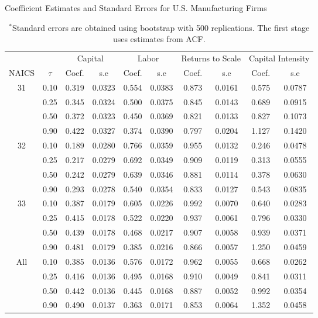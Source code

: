 \documentclass[12pt]{article}
\begin{document}
\begin{table}[H]
\centering
\caption{Coefficient Estimates and Standard Errors for U.S. Manufacturing Firms}
\small
\begin{tabular}{cccccccccc}
  \hline\hline & & \multicolumn{2}{c}{Capital}  & \multicolumn{2}{c}{Labor} & \multicolumn{2}{c}{Returns to Scale} & \multicolumn{2}{c}{Capital Intensity}\\ \cmidrule(lr){3-4} \cmidrule(lr){5-6} \cmidrule(lr){7-8} \cmidrule(lr){9-10}NAICS & $\tau$ & Coef. & s.e & Coef. & s.e & Coef. & s.e & Coef. & s.e \\ 
  \hline
31 & 0.10 & 0.319 & 0.0323 & 0.554 & 0.0383 & 0.873 & 0.0161 & 0.575 & 0.0787 \\ 
   & 0.25 & 0.345 & 0.0324 & 0.500 & 0.0375 & 0.845 & 0.0143 & 0.689 & 0.0915 \\ 
   & 0.50 & 0.372 & 0.0323 & 0.450 & 0.0369 & 0.821 & 0.0133 & 0.827 & 0.1073 \\ 
   & 0.90 & 0.422 & 0.0327 & 0.374 & 0.0390 & 0.797 & 0.0204 & 1.127 & 0.1420 \\ 
  32 & 0.10 & 0.189 & 0.0280 & 0.766 & 0.0359 & 0.955 & 0.0132 & 0.246 & 0.0478 \\ 
   & 0.25 & 0.217 & 0.0279 & 0.692 & 0.0349 & 0.909 & 0.0119 & 0.313 & 0.0555 \\ 
   & 0.50 & 0.242 & 0.0279 & 0.639 & 0.0346 & 0.881 & 0.0114 & 0.378 & 0.0630 \\ 
   & 0.90 & 0.293 & 0.0278 & 0.540 & 0.0354 & 0.833 & 0.0127 & 0.543 & 0.0835 \\ 
  33 & 0.10 & 0.387 & 0.0179 & 0.605 & 0.0226 & 0.992 & 0.0070 & 0.640 & 0.0283 \\ 
   & 0.25 & 0.415 & 0.0178 & 0.522 & 0.0220 & 0.937 & 0.0061 & 0.796 & 0.0330 \\ 
   & 0.50 & 0.439 & 0.0178 & 0.468 & 0.0217 & 0.907 & 0.0058 & 0.939 & 0.0371 \\ 
   & 0.90 & 0.481 & 0.0179 & 0.385 & 0.0216 & 0.866 & 0.0057 & 1.250 & 0.0459 \\ 
  All & 0.10 & 0.385 & 0.0136 & 0.576 & 0.0172 & 0.962 & 0.0055 & 0.668 & 0.0262 \\ 
   & 0.25 & 0.416 & 0.0136 & 0.495 & 0.0168 & 0.910 & 0.0049 & 0.841 & 0.0311 \\ 
   & 0.50 & 0.442 & 0.0136 & 0.445 & 0.0168 & 0.887 & 0.0052 & 0.992 & 0.0354 \\ 
   & 0.90 & 0.490 & 0.0137 & 0.363 & 0.0171 & 0.853 & 0.0064 & 1.352 & 0.0458 \\ 
   \hline
\end{tabular}
\caption*{\footnotesize $^{*}$Standard errors are obtained using bootstrap with 500 replications. The first stage uses estimates from ACF.}
\label{USQACF}
\end{table}
\end{document}
